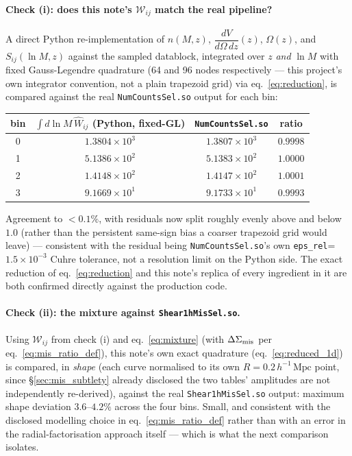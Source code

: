 \documentclass[a4paper, 11pt]{article}
\newcommand{\hMpc}{h^{-1}\,\mathrm{Mpc}}
\newcommand{\lnM}{\ln M}
\newcommand{\dVdz}{\dfrac{dV}{d\Omega\,dz}}
\newcommand{\Wcal}{\mathcal{W}}
\begin{document}
\paragraph{Check (i): does this note's $\Wcal_{ij}$ match the real pipeline?}
A direct Python re-implementation of $n(M,z)$, $\dVdz(z)$,
$\Omega(z)$, and $S_{ij}(\lnM,z)$ against the sampled datablock,
integrated over $z$ \emph{and} $\lnM$ with fixed Gauss-Legendre
quadrature (64 and 96 nodes respectively --- this project's own
integrator convention, not a plain trapezoid grid) via
eq.~\eqref{eq:reduction}, is compared against the real
\texttt{NumCountsSel.so} output for each bin:
\begin{center}
\small
\begin{tabular}{c c c c}
\toprule
bin & $\int d\lnM\,\widehat W_{ij}$ (Python, fixed-GL) & \texttt{NumCountsSel.so} & ratio \\
\midrule
0 & $1.3804\times10^{3}$ & $1.3807\times10^{3}$ & $0.9998$ \\
1 & $5.1386\times10^{2}$ & $5.1383\times10^{2}$ & $1.0000$ \\
2 & $1.4148\times10^{2}$ & $1.4147\times10^{2}$ & $1.0001$ \\
3 & $9.1669\times10^{1}$ & $9.1733\times10^{1}$ & $0.9993$ \\
\bottomrule
\end{tabular}
\end{center}
Agreement to $<0.1\%$, with residuals now split roughly evenly above
and below $1.0$ (rather than the persistent same-sign bias a coarser
trapezoid grid would leave) --- consistent with the residual being
\texttt{NumCountsSel.so}'s own \texttt{eps\_rel}=$1.5\times10^{-3}$
Cuhre tolerance, not a resolution limit on the Python side. The exact
reduction of
eq.~\eqref{eq:reduction} and this note's replica of every ingredient
in it are both confirmed directly against the production code.

\paragraph{Check (ii): the mixture against \texttt{Shear1hMisSel.so}.}
Using $\Wcal_{ij}$ from check (i) and eq.~\eqref{eq:mixture} (with
$\Delta\Sigma_{\rm mis}$ per eq.~\ref{eq:mis_ratio_def}), this note's
own exact quadrature (eq.~\ref{eq:reduced_1d}) is compared, in
\emph{shape} (each curve normalised to its own $R=0.2\,\hMpc$ point,
since \S\ref{sec:mis_subtlety} already disclosed the two tables'
amplitudes are not independently re-derived), against the real
\texttt{Shear1hMisSel.so} output: maximum shape deviation
$3.6$--$4.2\%$ across the four bins. Small, and consistent with the
disclosed modelling choice in eq.~\eqref{eq:mis_ratio_def} rather
than with an error in the radial-factorisation approach itself ---
which is what the next comparison isolates.
\end{document}
